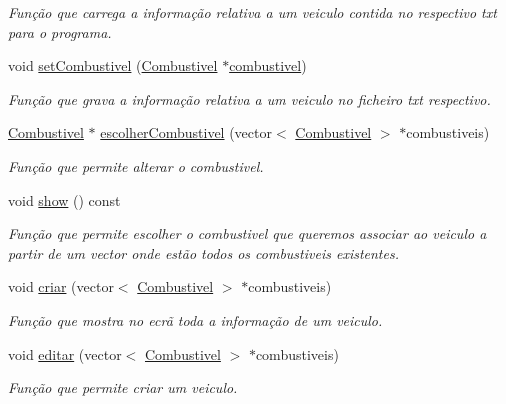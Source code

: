 \begin{DoxyCompactItemize}
\begin{DoxyCompactList}\small\item\em Função que carrega a informação relativa a um veiculo contida no respectivo txt para o programa. \end{DoxyCompactList}\item 
void \hyperlink{class_veiculo_a885e49550f411dc99fa09ba226476679}{set\+Combustivel} (\hyperlink{class_combustivel}{Combustivel} $\ast$\hyperlink{class_veiculo_ad8416cc9da449baed5e07ed146572712}{combustivel})
\begin{DoxyCompactList}\small\item\em Função que grava a informação relativa a um veiculo no ficheiro txt respectivo. \end{DoxyCompactList}\item 
\hyperlink{class_combustivel}{Combustivel} $\ast$ \hyperlink{class_veiculo_a1f712b4c2a5b88c9d7fc6b0c35bd1547}{escolher\+Combustivel} (vector$<$ \hyperlink{class_combustivel}{Combustivel} $>$ $\ast$combustiveis)
\begin{DoxyCompactList}\small\item\em Função que permite alterar o combustivel. \end{DoxyCompactList}\item 
void \hyperlink{class_veiculo_ada18ff760e31a0ff31893eab3ac707ea}{show} () const 
\begin{DoxyCompactList}\small\item\em Função que permite escolher o combustivel que queremos associar ao veiculo a partir de um vector onde estão todos os combustiveis existentes. \end{DoxyCompactList}\item 
void \hyperlink{class_veiculo_a74d91260effb553fecdfdab126336d06}{criar} (vector$<$ \hyperlink{class_combustivel}{Combustivel} $>$ $\ast$combustiveis)
\begin{DoxyCompactList}\small\item\em Função que mostra no ecrã toda a informação de um veiculo. \end{DoxyCompactList}\item 
void \hyperlink{class_veiculo_af5d45a28c046917dda3ccfbfd3603825}{editar} (vector$<$ \hyperlink{class_combustivel}{Combustivel} $>$ $\ast$combustiveis)
\begin{DoxyCompactList}\small\item\em Função que permite criar um veiculo. \end{DoxyCompactList}\end{DoxyCompactItemize}
